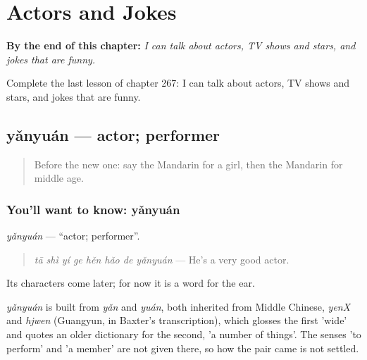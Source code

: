 
\chapter{Actors and Jokes}
\label{ch:zh-actors-and-jokes}

\begin{chapteropening}
\textbf{By the end of this chapter:} \emph{I can talk about actors, TV shows and stars, and jokes that are funny.}

Complete the last lesson of chapter 267: I can talk about actors, TV shows and stars, and jokes that are funny.
\end{chapteropening}

\section[yǎnyuán]{yǎnyuán — actor; performer}

\label{lesson:ZH-C267-yanyuan}



\begin{quote}
Before the new one: say the Mandarin for a girl, then the Mandarin for middle age.
\end{quote}

\subsection*{You'll want to know: yǎnyuán}
\emph{yǎnyuán} — \textquotedblleft{}actor; performer\textquotedblright{}.

\begin{quote}
\emph{tā shì yí ge hěn hǎo de yǎnyuán} — He's a very good actor.
\end{quote}

Its characters come later; for now it is a word for the ear.

\begin{cousinweb}
\emph{yǎnyuán} is built from \emph{yǎn} and \emph{yuán}, both inherited from Middle Chinese, \emph{yenX} and \emph{hjwen} (Guangyun, in Baxter's transcription), which glosses the first 'wide' and quotes an older dictionary for the second, 'a number of things'. The senses 'to perform' and 'a member' are not given there, so how the pair came is not settled.
\end{cousinweb}

